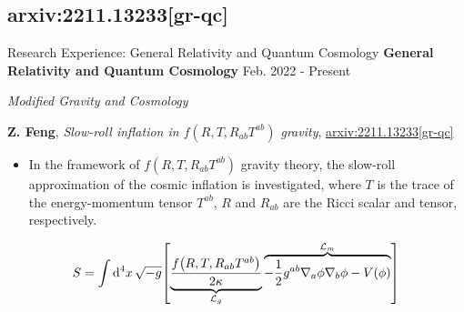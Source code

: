 \documentclass[9pt,aspectratio=169,hyperref=colorlinks]{beamer}
\begin{document}
\subsection{arxiv:2211.13233[gr-qc]}
\begin{frame}{Research Experience: General Relativity and Quantum Cosmology}
    \textbf{General Relativity and Quantum Cosmology} \hfill Feb. 2022 - Present

    \smallskip \quad \textit{Modified Gravity and Cosmology}

    \textbf{Z. Feng}, \textit{Slow-roll inflation in $f\left(R, T, R_{ab}T^{ab}\right)$ gravity}, \href{https://arxiv.org/abs/2211.13233}{arxiv:2211.13233[gr-qc]}

    \begin{itemize}
        \item In the framework of $f\left(R, T, R_{ab}T^{ab}\right)$ gravity theory, the slow-roll approximation of the cosmic inflation is investigated, where $T$ is the trace of the energy-momentum tensor $T^{ab}$, $R$ and $R_{ab}$ are the Ricci scalar and tensor, respectively.
    \end{itemize}

    \[S = \int \dd[4]{x} \sqrt{-g} \qty[\underbrace{\frac{f\qty(R, T, R_{ab}T^{ab})}{2 \kappa}}_{\mathcal{L}_g} \overbrace{- \frac{1}{2} g^{ab} \nabla_{a} \phi \nabla_{b} \phi - V(\phi)}^{\mathcal{L}_m}]\]
\end{frame}
\end{document}
